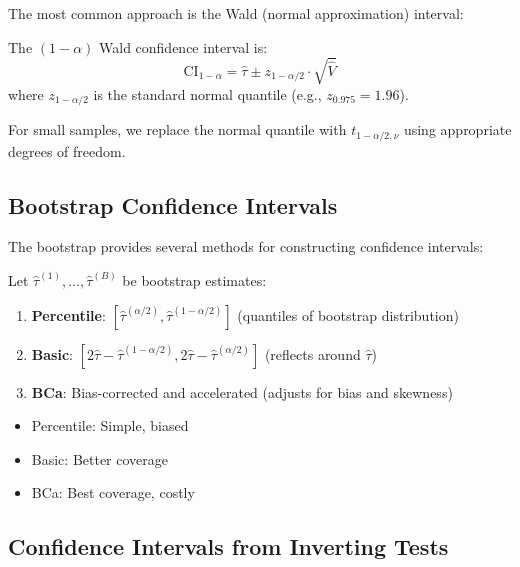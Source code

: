 The most common approach is the Wald (normal approximation) interval:

\begin{definition}
\label{def:wald_ci}
The $(1-\alpha)$ Wald confidence interval is:
\begin{equation}
\text{CI}_{1-\alpha} = \hat{\tau} \pm z_{1-\alpha/2} \cdot \sqrt{\hat{V}}
\label{eq:wald_ci}
\end{equation}
where $z_{1-\alpha/2}$ is the standard normal quantile (e.g., $z_{0.975} = 1.96$).
\end{definition}

For small samples, we replace the normal quantile with $t_{1-\alpha/2, \nu}$ using appropriate degrees of freedom.

\subsection{Bootstrap Confidence Intervals}

The bootstrap provides several methods for constructing confidence intervals:

\begin{definition}
\label{def:bootstrap_ci}
Let $\hat{\tau}^{(1)}, \ldots, \hat{\tau}^{(B)}$ be bootstrap estimates:
\begin{enumerate}
    \item \textbf{Percentile}: $[\hat{\tau}^{(\alpha/2)}, \hat{\tau}^{(1-\alpha/2)}]$ (quantiles of bootstrap distribution)
    \item \textbf{Basic}: $[2\hat{\tau} - \hat{\tau}^{(1-\alpha/2)}, 2\hat{\tau} - \hat{\tau}^{(\alpha/2)}]$ (reflects around $\hat{\tau}$)
    \item \textbf{BCa}: Bias-corrected and accelerated (adjusts for bias and skewness)
\end{enumerate}
\end{definition}

\begin{proposition}
\begin{itemize}
    \item Percentile: Simple, biased
    \item Basic: Better coverage
    \item BCa: Best coverage, costly
\end{itemize}
\end{proposition}

\subsection{Confidence Intervals from Inverting Tests}

